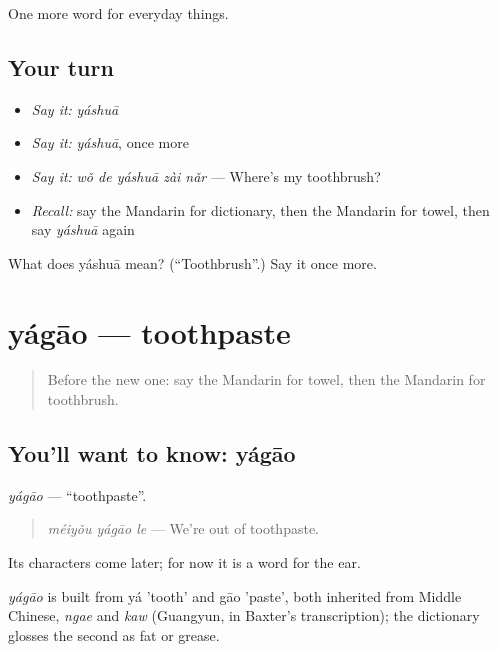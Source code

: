 \begin{grammarlens}[title={What you've built}]
One more word for everyday things.
\end{grammarlens}

\subsection*{Your turn}
\begin{itemize}
\raggedright
  \item \emph{Say it:} \emph{yáshuā}
  \item \emph{Say it:} \emph{yáshuā}, once more
  \item \emph{Say it:} \emph{wǒ de yáshuā zài nǎr} — Where's my toothbrush?
  \item \emph{Recall:} say the Mandarin for dictionary, then the Mandarin for towel, then say \emph{yáshuā} again
\end{itemize}

\begin{tcolorbox}[breakable,colback=teal!4,colframe=teal!35!black,title={Before you move on}]
What does yáshuā mean? (\textquotedblleft{}Toothbrush\textquotedblright{}.) Say it once more.
\end{tcolorbox}
\section[yágāo]{yágāo — toothpaste}

\label{lesson:ZH-C105-yagao}



\begin{quote}
Before the new one: say the Mandarin for towel, then the Mandarin for toothbrush.
\end{quote}

\subsection*{You'll want to know: yágāo}
\emph{yágāo} — \textquotedblleft{}toothpaste\textquotedblright{}.

\begin{quote}
\emph{méiyǒu yágāo le} — We're out of toothpaste.
\end{quote}

Its characters come later; for now it is a word for the ear.

\begin{cousinweb}
\emph{yágāo} is built from yá 'tooth' and gāo 'paste', both inherited from Middle Chinese, \emph{ngae} and \emph{kaw} (Guangyun, in Baxter's transcription); the dictionary glosses the second as fat or grease.
\end{cousinweb}

